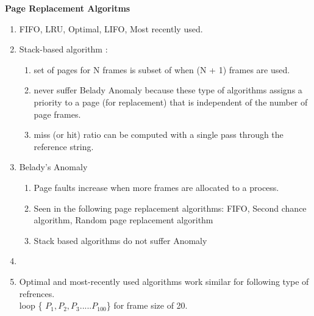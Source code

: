 
\centerline{\textbf{ \LARGE Page Replacement Algoritms}}




\begin{enumerate}

  \item FIFO, LRU, Optimal, LIFO, Most recently used.

  \item Stack-based algorithm :
      \begin{enumerate}
          \item set of pages for N frames is subset of when (N + 1) frames are used.
          \item never suffer Belady Anomaly because these type of algorithms assigns a priority to a page (for replacement)
                that is independent of the number of page frames.
          \item miss (or hit) ratio can be computed with a single pass through the reference string.
      \end{enumerate}

  \item Belady’s Anomaly
      \begin{enumerate}
          \item Page faults increase when more frames are allocated to a process.
          \item Seen in the following page replacement algorithms: FIFO, Second chance algorithm, Random page replacement algorithm
          \item Stack based algorithms do not suffer Anomaly
      \end{enumerate}
  \item

  \item Optimal and most-recently used algorithms work similar for following type of refrences. \\loop \{ \(P_1, P_2, P_3 ..... P_{100} \)\} for frame size of 20.



\end{enumerate}








